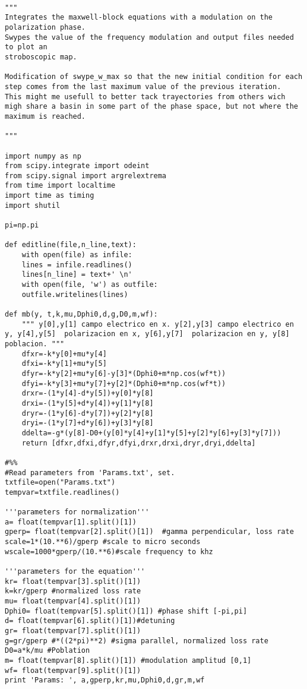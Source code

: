 	\begin{lstlisting}

"""
Integrates the maxwell-block equations with a modulation on the polarization phase.
Swypes the value of the frequency modulation and output files needed to plot an
stroboscopic map.

Modification of swype_w_max so that the new initial condition for each step comes from the last maximum value of the previous iteration.
This might me usefull to better tack trayectories from others wich migh share a basin in some part of the phase space, but not where the maximum is reached.

"""

import numpy as np
from scipy.integrate import odeint
from scipy.signal import argrelextrema
from time import localtime
import time as timing
import shutil

pi=np.pi

def editline(file,n_line,text):
	with open(file) as infile:
	lines = infile.readlines()
	lines[n_line] = text+' \n'
	with open(file, 'w') as outfile:
	outfile.writelines(lines)  

def mb(y, t,k,mu,Dphi0,d,g,D0,m,wf):
	""" y[0],y[1] campo electrico en x. y[2],y[3] campo electrico en y, y[4],y[5]  polarizacion en x, y[6],y[7]  polarizacion en y, y[8] poblacion. """
	dfxr=-k*y[0]+mu*y[4]
	dfxi=-k*y[1]+mu*y[5]
	dfyr=-k*y[2]+mu*y[6]-y[3]*(Dphi0+m*np.cos(wf*t))
	dfyi=-k*y[3]+mu*y[7]+y[2]*(Dphi0+m*np.cos(wf*t))
	drxr=-(1*y[4]-d*y[5])+y[0]*y[8]
	drxi=-(1*y[5]+d*y[4])+y[1]*y[8]
	dryr=-(1*y[6]-d*y[7])+y[2]*y[8]
	dryi=-(1*y[7]+d*y[6])+y[3]*y[8]
	ddelta=-g*(y[8]-D0+(y[0]*y[4]+y[1]*y[5]+y[2]*y[6]+y[3]*y[7]))
	return [dfxr,dfxi,dfyr,dfyi,drxr,drxi,dryr,dryi,ddelta]

#%%
#Read parameters from 'Params.txt', set.
txtfile=open("Params.txt")
tempvar=txtfile.readlines()

'''parameters for normalization'''
a= float(tempvar[1].split()[1])
gperp= float(tempvar[2].split()[1])  #gamma perpendicular, loss rate
scale=1*(10.**6)/gperp #scale to micro seconds
wscale=1000*gperp/(10.**6)#scale frequency to khz

'''parameters for the equation'''
kr= float(tempvar[3].split()[1])
k=kr/gperp #normalized loss rate
mu= float(tempvar[4].split()[1])
Dphi0= float(tempvar[5].split()[1]) #phase shift [-pi,pi]
d= float(tempvar[6].split()[1])#detuning
gr= float(tempvar[7].split()[1])
g=gr/gperp #*((2*pi)**2) #sigma parallel, normalized loss rate
D0=a*k/mu #Poblation
m= float(tempvar[8].split()[1]) #modulation amplitud [0,1]
wf= float(tempvar[9].split()[1])
print 'Params: ', a,gperp,kr,mu,Dphi0,d,gr,m,wf


\end{lstlisting}
